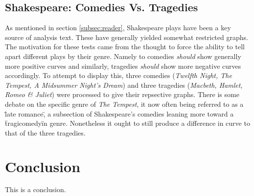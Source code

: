 \documentclass[a4paper]{article}
\begin{document}
    \subsection{Shakespeare: Comedies Vs. Tragedies}
    \label{subsec:comVsTrag}
        As mentioned in section \ref{subsec:reader}, Shakespeare plays have been a key source of analysis text. These have generally yielded somewhat restricted graphs. The motivation for these tests came from the thought to force the ability to tell apart different plays by their genre. Namely to comedies \textit{should} show generally more positive curves and similarly, tragedies \textit{should} show more negative curves accordingly. To attempt to display this, three comedies (\textit{Twelfth Night, The Tempest, A Midsummer Night's Dream}) and three tragedies (\textit{Macbeth, Hamlet, Romeo \& Juliet}) were processed to give their repsective graphs. There is some debate on the specific genre of \textit{The Tempest}, it now often being referred to as a \"late romance\", a subsection of Shakespeare's comedies leaning more toward a \"tragicomedy\" in genre. Nonetheless it ought to still produce a difference in curve to that of the three tragedies.
\newpage
\section{Conclusion}
	This is a conclusion.
\label{sec:conclusion}
\newpage


\end{document}
